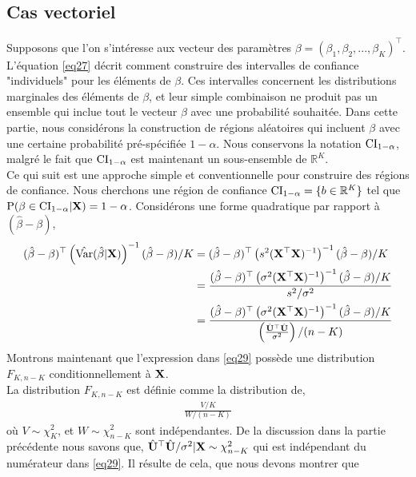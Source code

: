 \subsection{Cas vectoriel}
Supposons que l'on s'intéresse aux vecteur des paramètres $\beta =(\beta_1,\beta_2,...,\beta_K)^\top$. L'équation \eqref{eq27} décrit comment construire des intervalles de confiance "individuels" pour les éléments de $\beta$. Ces intervalles concernent les distributions marginales des éléments de $\beta$, et leur simple combinaison ne produit pas un ensemble qui inclue tout le vecteur $\beta$ avec une probabilité souhaitée. Dans cette partie, nous considérons la construction de régions aléatoires qui incluent $\beta$ avec une certaine probabilité pré-spécifiée $1-\alpha$. Nous conservons la notation $\mathrm{CI}_{1-\alpha}$, malgré le fait que  $\mathrm{CI}_{1-\alpha}$ est maintenant un sous-ensemble de $\mathbb{R}^K$.\\
Ce qui suit est une approche simple et conventionnelle pour construire des régions de confiance. Nous cherchons une région de confiance $\mathrm{CI}_{1-\alpha} = \{b \in \mathbb{R}^K\}$ tel que $\operatorname{P}(\beta \in \mathrm{CI}_{1-\alpha} | \mathbf X)=1-\alpha$. Considérons une forme quadratique par rapport à $(\hat{\beta}-\beta)$,
\begin{align}
(\hat{\beta}-\beta)^\top\left(\hat{\operatorname{Var}}(\hat{\beta}|\mathbf X)\right)^{-1}(\hat{\beta}-\beta)/K &=
(\hat{\beta}-\beta)^\top\left(s^2(\mathbf X^\top\mathbf X)^{-1}
\right)^{-1}
(\hat{\beta}-\beta)/K \nonumber\\
&=\frac{
(\hat{\beta}-\beta)^\top\left(\sigma^2(\mathbf X^\top\mathbf X)^{-1}
\right)^{-1}
(\hat{\beta}-\beta)/K}
{s^2/\sigma^2}\nonumber\\
&=\frac{
(\hat{\beta}-\beta)^\top\left(\sigma^2(\mathbf X^\top\mathbf X)^{-1}
\right)^{-1}
(\hat{\beta}-\beta)/K}
{\left(\frac{\hat{\mathbf U}^\top\hat{\mathbf U}}{\sigma^2}\right)/(n-K)}
\label{eq29}
\end{align}
Montrons maintenant que l'expression dans \eqref{eq29} possède une distribution $F_{K,n-K}$ conditionnellement à $\mathbf X$.\\
La distribution $F_{K,n-K}$ est définie comme la distribution de,
\begin{align*}
\frac{V/K}{W/(n-K)}
\end{align*}
où $V \sim \chi^2_K$, et $W\sim\chi^2_{n-K}$ sont indépendantes. De la discussion dans la partie précédente nous savons que, $\hat{\mathbf U}^\top\hat{\mathbf U}/\sigma^2|\mathbf X\sim\chi^2_{n-K}$ qui est indépendant du numérateur dans \eqref{eq29}. Il résulte de cela, que nous devons montrer que 
